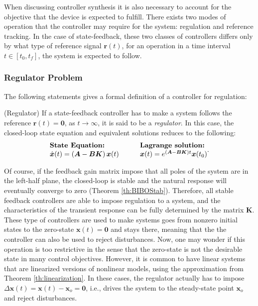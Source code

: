 \documentclass[a4paper,11pt]{book}
\numberwithin{figure}{chapter}
\numberwithin{equation}{chapter}
\numberwithin{table}{chapter}
\theoremstyle{definition}
\newtheorem{definition}{Definition}[chapter]
\newcounter{boxed-theorem}
\newcounter{boxed-lemma}
\newcounter{boxed-definition}
\newenvironment{boxed-definition}[1]
{\colorlet{shadecolor}{pastelYellow!15} \begin{shaded} \begin{definition}{#1}}
{\end{definition} \end{shaded}}
\newcounter{boxed-example}
\begin{document}
When discussing controller synthesis it is also necessary to account for the objective that the device is expected to fulfill. There exists two modes of operation that the controller may require for the system: regulation and reference tracking. In the case of state-feedback, these two classes of controllers differs only by what type of reference signal $\bm{r}(t)$, for an operation in a time interval $t \in [t_0, t_f]$, the system is expected to follow. 

\subsubsection{Regulator Problem}

The following statements gives a formal definition of a controller for regulation:

\begin{boxed-definition}{(Regulator)} \label{def:regulator}
    If a state-feedback controller has to make a system follows the reference $\bm{r}(t) = \bm{0}$, as $t \to \infty$, it is said to be a \textit{regulator}. In this case, the closed-loop state equation and equivalent solutions reduces to the following:
        \begin{align}
    \begin{matrix*}[l]
    \textbf{State Equation:} \hfill & & & \textbf{Lagrange solution:} \hfill \\
    \dot{\bm{x}}(t) = \left( \bm{A} - \bm{B} \bm{K} \right) \bm{x}(t)  & & &
    \bm{x}(t) = e^{(\bm{A} - \bm{B} \bm{K}) t} \bm{x}(t_0) \hfill
    \end{matrix*}
    .\end{align}
\end{boxed-definition}

Of course, if the feedback gain matrix impose that all poles of the system are in the left-half plane, the closed-loop is stable and the natural response will eventually converge to zero (Theorem \ref{th:BIBOStab}). Therefore, all stable feedback controllers are able to impose regulation to a system, and the characteristics of the transient response can be fully determined by the matrix $\bm{K}$. These type of controllers are used to make systems goes from nonzero initial states to the zero-state $\bm{x}(t) = \bm{0}$ and stays there, meaning that the the controller can also be used to reject disturbances. Now, one may wonder if this operation is too restrictive in the sense that the zero-state is not the desirable state in many control objectives. However, it is common to have linear systems that are linearized versions of nonlinear models, using the approximation from Theorem \ref{th:linearization}. In these cases, the regulator actually has to impose $\Delta \bm{x}(t) = \bm{x}(t) - \bm{x}_o = \bm{0}$, i.e., drives the system to the steady-state point $\bm{x}_o$ and reject disturbances. 
\end{document}
